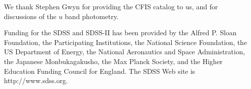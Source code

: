 \documentclass{aastex63}
\begin{document}

\acknowledgments

We thank Stephen Gwyn for providing the CFIS catalog to us, and for discussions of the
$u$ band photometry. 

Funding for the SDSS and SDSS-II has been provided by the Alfred P. Sloan Foundation, the Participating
Institutions, the National Science Foundation, the US Department of Energy, the National Aeronautics and 
Space Administration, the Japanese Monbukagakusho, the Max Planck Society, and the Higher Education 
Funding Council for England. The SDSS Web site is http://www.sdss.org.
 
\vspace{5mm}


{}


%
 
\end{document}
